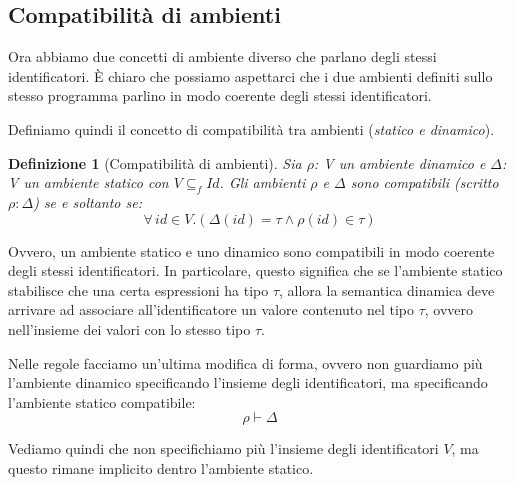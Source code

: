 \documentclass[oneside,a4paper,11pt]{book}
\theoremstyle{italicstyle}
\newtheorem{definizione}{Definizione}[section]
\theoremstyle{normStyle}
\begin{document}
\subsection{Compatibilità di ambienti}
Ora abbiamo due concetti di ambiente diverso che parlano degli stessi identificatori.
È chiaro che possiamo aspettarci che i due ambienti definiti sullo stesso programma 
parlino in modo coerente degli stessi identificatori.

Definiamo quindi il concetto di compatibilità tra ambienti (\textit{statico e dinamico}).
\begin{definizione}[Compatibilità di ambienti]
  Sia $\rho$: V un ambiente dinamico e $\Delta$: V un ambiente statico con $V\subseteq_f Id$.
  Gli ambienti $\rho$ e $\Delta$ sono compatibili (scritto $\rho : \Delta$) se e soltanto se:
  \[
    \forall \,id \in V . (\Delta(id) = \tau \land \rho(id) \in \tau)
  \]
\end{definizione}
Ovvero, un ambiente statico e uno dinamico sono compatibili in modo coerente 
degli stessi identificatori. In particolare, questo significa che se l'ambiente 
statico stabilisce che una certa espressioni ha tipo $\tau$, allora la semantica dinamica
deve arrivare ad associare all'identificatore un valore contenuto nel tipo $\tau$, 
ovvero nell'insieme dei valori con lo stesso tipo $\tau$.

Nelle regole facciamo un'ultima modifica di forma, ovvero non guardiamo più 
l'ambiente dinamico specificando l'insieme degli identificatori, ma specificando 
l'ambiente statico compatibile: 
\[
  \rho \vdash \Delta
\]

Vediamo quindi che non specifichiamo più l'insieme degli identificatori $V$, 
ma questo rimane implicito dentro l'ambiente statico.
\end{document}
